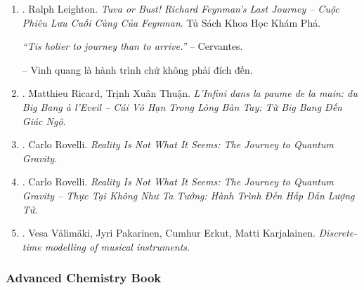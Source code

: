 \documentclass{article}
\begin{document}
\begin{enumerate}
	\item \cite{Leighton_Feyman_last_journey_VN}. {\sc Ralph Leighton}. {\it Tuva or Bust! Richard Feynman's Last Journey -- Cuộc Phiêu Lưu Cuối Cùng Của Feynman}. Tủ Sách Khoa Học Khám Phá.\hfill{\sf[done]}

	{\it``Tis holier to journey than to arrive.''} -- {\sc Cervantes.}

	-- Vinh quang là hành trình chứ không phải đích đến. \cite[Suy ngẫm 2000, p. 269]{Leighton_Feyman_last_journey_VN}
	
	\item \cite{Ricard_Thuan_infinity_VN}. {\sc Matthieu Ricard, Trịnh Xuân Thuận}. {\it L'Infini dans la paume de la main: du Big Bang à l'Eveil -- Cái Vô Hạn Trong Lòng Bàn Tay: Từ Big Bang Đến Giác Ngộ}.\hfill{\sf[done]}

	\item \cite{Rovelli_reality}. {\sc Carlo Rovelli}. {\it Reality Is Not What It Seems: The Journey to Quantum Gravity}.

	\item \cite{Rovelli_reality_VN}. {\sc Carlo Rovelli}. {\it Reality Is Not What It Seems: The Journey to Quantum Gravity -- Thực Tại Không Như Ta Tưởng: Hành Trình Đến Hấp Dẫn Lượng Tử}.\hfill{\sf[done]}

	\item \cite{Valimaki_Pakarinen_Erkut_Karjalainen2006}. {\sc Vesa V\"alim\"aki, Jyri Pakarinen, Cumhur Erkut, Matti Karjalainen}. {\it Discrete-time modelling of musical instruments}.
\end{enumerate}


\subsubsection{Advanced Chemistry Book}
\end{document}
